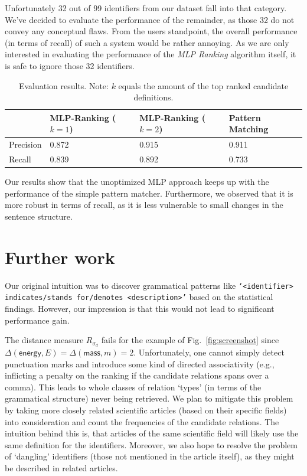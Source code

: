 \documentclass[runningheads]{llncs}
\begin{document}
Unfortunately 32 out of 99 identifiers from our dataset fall into that category.
We've decided to evaluate the performance of the remainder, as those 32 do not
convey any conceptual flaws. From the users standpoint, the overall performance
(in terms of recall) of such a system would be rather annoying. As we are only
interested in evaluating the performance of the \emph{MLP Ranking} algorithm itself,
it is safe to ignore those 32 identifiers.

\begin{table}[H]
\vspace{-5pt}
	\begin{center}
		\begin{tabular}{| l | l | l | l |}
			\hline
			 & MLP-Ranking ($k=1$) & MLP-Ranking ($k=2$) & Pattern Matching \\
			\hline
			Precision &  0.872  &  0.915  &  0.911  \\
			Recall    &  0.839  &  0.892  &  0.733  \\
			\hline
		\end{tabular}
	\end{center}
\caption{Evaluation results. Note: $k$ equals the amount of the top ranked candidate definitions.}
\vspace{-20pt}
\end{table}

Our results show that the unoptimized MLP approach keeps up with the
performance of the simple pattern matcher. Furthermore, we observed that it is
more robust in terms of recall, as it is less vulnerable to small changes in
the sentence structure.


\section{Further work}

Our original intuition was to discover grammatical patterns like
\texttt{`\emph{<identifier>} indicates/stands for/denotes
\emph{<description>}'} based on the statistical findings. However, our
impression is that this would not lead to significant performance gain.


The distance measure $R_{\sigma_d}$ fails for the example of
Fig.~\ref{fig:screenshot} since $\Delta(\mathsf{energy},E) =
\Delta(\mathsf{mass},m) = 2$. Unfortunately, one cannot simply detect
punctuation marks and introduce some kind of directed associativity
(e.g., inflicting a penalty on the ranking if the candidate relations spans over a
comma). This leads to whole classes of relation `types' (in terms of the
grammatical structure) never being retrieved. We plan to mitigate this problem
by taking more closely related scientific articles (based on their specific
fields) into consideration and count the frequencies of the candidate
relations. The intuition behind this is, that articles of the same scientific
field will likely use the same definition for the identifiers. Moreover,
we also hope to resolve the problem of `dangling' identifiers (those not
mentioned in the article itself), as they might be described in related
articles.
\end{document}
